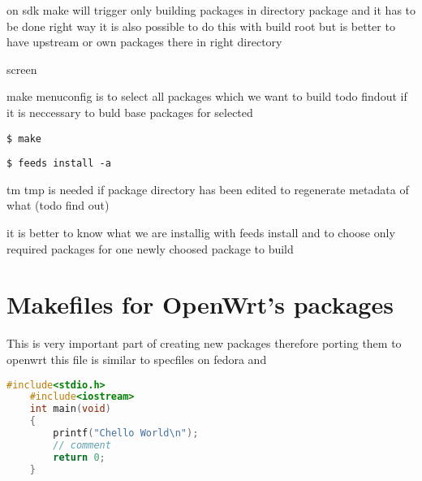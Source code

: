 on sdk make will trigger only building packages in directory package and it has to be done right way
it is also possible to do this with build root but is better to have upstream or own packages there in right directory

screen

make menuconfig is to select all packages which we want to build  todo findout if it is neccessary to buld base packages for selected

{\tt \$ make}

{\tt \$ feeds install -a}

tm tmp is needed if package directory has been edited to regenerate metadata of what (todo find out)

it is better to know what we are installig with feeds install and to choose only required packages for one newly choosed package to build

\section{Makefiles for OpenWrt's packages}

This is very important part of creating new packages therefore porting them to openwrt this file is similar to specfiles on fedora and

\begin{lstlisting}[language=c,basicstyle=\ttfamily\footnotesize,label=c,caption=Basic C code.]
    #include<stdio.h>
    #include<iostream>
    int main(void)
    {
        printf("Chello World\n");
        // comment
        return 0;
    }
\end{lstlisting}
